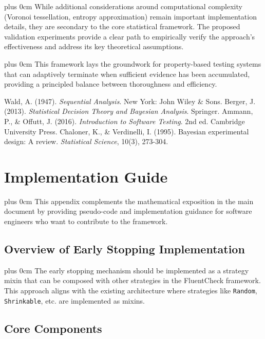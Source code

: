 \documentclass[11pt,a4paper]{article}
\newcommand{\justifytext}{\leftskip=0pt \rightskip=0pt plus 0cm}
\begin{document}
\justifytext
While additional considerations around computational complexity (Voronoi tessellation, entropy approximation) remain important implementation details, they are secondary to the core statistical framework. The proposed validation experiments provide a clear path to empirically verify the approach's effectiveness and address its key theoretical assumptions.

\justifytext
This framework lays the groundwork for property-based testing systems that can adaptively terminate when sufficient evidence has been accumulated, providing a principled balance between thoroughness and efficiency.

\begin{thebibliography}{99}
 Wald, A. (1947). \textit{Sequential Analysis}. New York: John Wiley \& Sons.
 Berger, J. (2013). \textit{Statistical Decision Theory and Bayesian Analysis}. Springer.
 Ammann, P., \& Offutt, J. (2016). \textit{Introduction to Software Testing}. 2nd ed. Cambridge University Press.
 Chaloner, K., \& Verdinelli, I. (1995). Bayesian experimental design: A review. \textit{Statistical Science}, 10(3), 273-304.
\end{thebibliography}

\appendix

\section{Implementation Guide}
\label{sec:implementation-guide}

\justifytext
This appendix complements the mathematical exposition in the main document by providing pseudo-code and implementation guidance for software engineers who want to contribute to the framework.

\subsection{Overview of Early Stopping Implementation}

\justifytext
The early stopping mechanism should be implemented as a strategy mixin that can be composed with other strategies in the FluentCheck framework. This approach aligns with the existing architecture where strategies like \texttt{Random}, \texttt{Shrinkable}, etc. are implemented as mixins.

\subsection{Core Components}
\end{document}
